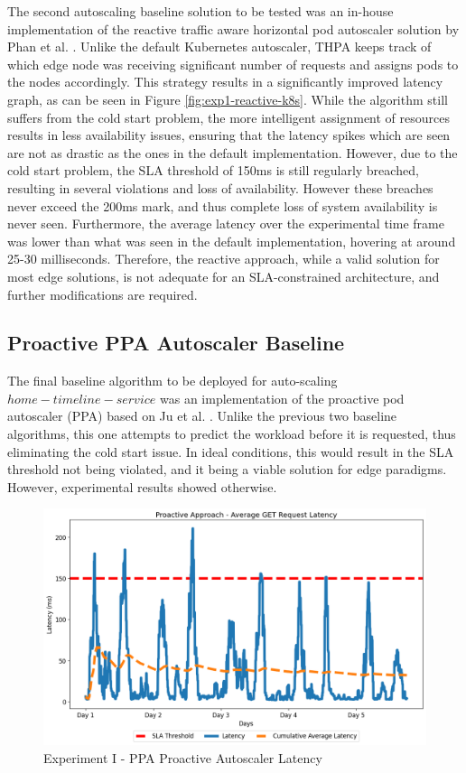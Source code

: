 The second autoscaling baseline solution to be tested was an in-house implementation of the reactive traffic aware horizontal pod autoscaler solution by Phan et al. \cite{phan2022traffic}. Unlike the default Kubernetes autoscaler, THPA keeps track of which edge node was receiving significant number of requests and assigns pods to the nodes accordingly. This strategy results in a significantly improved latency graph, as can be seen in Figure \ref{fig:exp1-reactive-k8s}. While the algorithm still suffers from the cold start problem, the more intelligent assignment of resources results in less availability issues, ensuring that the latency spikes which are seen are not as drastic as the ones in the default implementation. However, due to the cold start problem, the SLA threshold of 150ms is still regularly breached, resulting in several violations and loss of availability. However these breaches never exceed the 200ms mark, and thus complete loss of system availability is never seen. Furthermore, the average latency over the experimental time frame was lower than what was seen in the default implementation, hovering at around 25-30 milliseconds. Therefore, the reactive approach, while a valid solution for most edge solutions, is not adequate for an SLA-constrained architecture, and further modifications are required.\par

\subsection {Proactive PPA Autoscaler Baseline}
\label{subsec:ch5-exp1-proactive-algo}

The final baseline algorithm to be deployed for auto-scaling $home-timeline-service$ was an implementation of the proactive pod autoscaler (PPA) based on Ju et al. \cite{ju2021proactive}. Unlike the previous two baseline algorithms, this one attempts to predict the workload before it is requested, thus eliminating the cold start issue. In ideal conditions, this would result in the SLA threshold not being violated, and it being a viable solution for edge paradigms. However, experimental results showed otherwise.\par

\begin{figure}[htb]
    \centering
    \caption{Experiment I - PPA Proactive Autoscaler Latency}
    \label{fig:exp1-proactive-k8s}
    \includegraphics[width=0.6\linewidth]{Figures/Home-Timeline-Proactive-Latency.png}
\end{figure}


